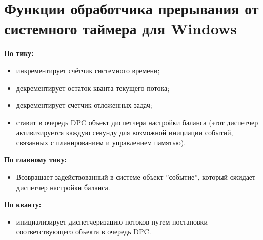 \documentclass[a4paper,oneside,14pt]{extreport}
\begin{document}


\section*{Функции обработчика прерывания от системного таймера для Windows}
\noindent
\textbf{По тику:}
\begin{itemize}
	\item инкрементирует счётчик системного времени;
	\item декрементирует остаток кванта текущего потока;
	\item декрементирует счетчик отложенных задач;
	\item ставит в очередь DPC объект диспетчера настройки баланса
	(этот диспетчер активизируется каждую секунду для возможной инициации событий,
	связанных с планированием и управлением памятью).
\end{itemize}
\textbf{По главному тику:}
\begin{itemize}
	\item Возвращает задействованный в системе объект ''событие'', который ожидает диспетчер настройки баланса.
\end{itemize}
\textbf{По кванту:}
\begin{itemize}
	\item инициализирует диспетчеризацию потоков путем постановки соответствующего объекта в очередь DPC.
\end{itemize}
\end{document}
